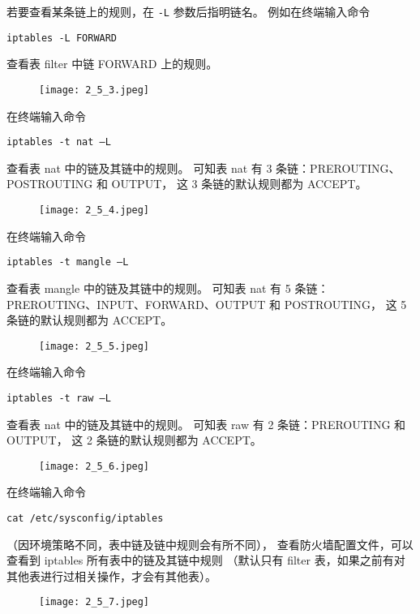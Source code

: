 若要查看某条链上的规则，在 \texttt{-L} 参数后指明链名。
例如在终端输入命令
\begin{verbatim}
iptables -L FORWARD
\end{verbatim}
查看表 filter 中链 FORWARD 上的规则。
\begin{figure}[H]
  \begin{center}
    \texttt{[image: 2\_5\_3.jpeg]}
  \end{center}
\end{figure}

在终端输入命令
\begin{verbatim}
iptables -t nat –L
\end{verbatim}
查看表 nat 中的链及其链中的规则。
可知表 nat 有 3 条链：PREROUTING、POSTROUTING 和 OUTPUT，
这 3 条链的默认规则都为 ACCEPT。
\begin{figure}[H]
  \begin{center}
    \texttt{[image: 2\_5\_4.jpeg]}
  \end{center}
\end{figure}

在终端输入命令
\begin{verbatim}
iptables -t mangle –L
\end{verbatim}
查看表 mangle 中的链及其链中的规则。
可知表 nat 有 5 条链：PREROUTING、INPUT、FORWARD、OUTPUT 和 POSTROUTING，
这 5 条链的默认规则都为 ACCEPT。
\begin{figure}[H]
  \begin{center}
    \texttt{[image: 2\_5\_5.jpeg]}
  \end{center}
\end{figure}

在终端输入命令
\begin{verbatim}
iptables -t raw –L
\end{verbatim}
查看表 nat 中的链及其链中的规则。
可知表 raw 有 2 条链：PREROUTING 和 OUTPUT，
这 2 条链的默认规则都为 ACCEPT。
\begin{figure}[H]
  \begin{center}
    \texttt{[image: 2\_5\_6.jpeg]}
  \end{center}
\end{figure}

在终端输入命令
\begin{verbatim}
cat /etc/sysconfig/iptables
\end{verbatim}
（因环境策略不同，表中链及链中规则会有所不同），
查看防火墙配置文件，可以查看到 iptables 所有表中的链及其链中规则
（默认只有 filter 表，如果之前有对其他表进行过相关操作，才会有其他表）。
\begin{figure}[H]
  \begin{center}
    \texttt{[image: 2\_5\_7.jpeg]}
  \end{center}
\end{figure}

